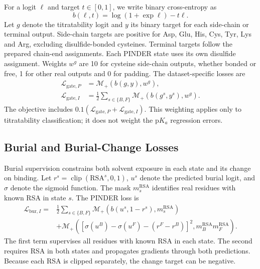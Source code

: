 For a logit $\ell$ and target $t\in[0,1]$, we write binary cross-entropy as
\begin{equation}
    b(\ell,t)=\log(1+\exp\ell)-t\ell.
    \label{eq:jaxka-binary-cross-entropy}
\end{equation}
Let $g$ denote the titratability logit and $y$ its binary target for each side-chain or terminal output. Side-chain targets are positive for Asp, Glu, His, Cys, Tyr, Lys and Arg, excluding disulfide-bonded cysteines. Terminal targets follow the prepared chain-end assignments. Each PINDER state uses its own disulfide assignment. Weights $w^g$ are 10 for cysteine side-chain outputs, whether bonded or free, 1 for other real outputs and 0 for padding. The dataset-specific losses are
\begin{equation}
    \begin{aligned}
        \mathcal L_{\mathrm{gate},P}
        &=\mathcal M_+\!\left(b(g,y),w^g\right),\\
        \mathcal L_{\mathrm{gate},I}
        &=\tfrac12\sum_{s\in\{B,F\}}
          \mathcal M_+\!\left(b(g^s,y^s),w^g\right).
    \end{aligned}
    \label{eq:jaxka-titratability-loss}
\end{equation}
The objective includes $0.1(\mathcal L_{\mathrm{gate},P}+\mathcal L_{\mathrm{gate},I})$. This weighting applies only to titratability classification; it does not weight the $\mathrm{p}K_a$ regression errors.

\subsection{Burial and Burial-Change Losses}
\label{app:jaxka-burial-losses}

Burial supervision constrains both solvent exposure in each state and its change on binding. Let $r^s=\operatorname{clip}(\mathrm{RSA}^s,0,1)$, $u^s$ denote the predicted burial logit, and $\sigma$ denote the sigmoid function. The mask $m_s^{\mathrm{RSA}}$ identifies real residues with known RSA in state $s$. The PINDER loss is
\begin{equation}
    \begin{aligned}
        \mathcal L_{\mathrm{bur},I}
        ={}&\tfrac12\sum_{s\in\{B,F\}}
        \mathcal M_+\!\left(b(u^s,1-r^s),m_s^{\mathrm{RSA}}\right)\\
        &+\mathcal M_+\!\left(
        \left[\sigma(u^B)-\sigma(u^F)-(r^F-r^B)\right]^2,
        m_B^{\mathrm{RSA}}m_F^{\mathrm{RSA}}
        \right).
    \end{aligned}
    \label{eq:jaxka-pinder-burial-loss}
\end{equation}
The first term supervises all residues with known RSA in each state. The second requires RSA in both states and propagates gradients through both predictions. Because each RSA is clipped separately, the change target can be negative.

